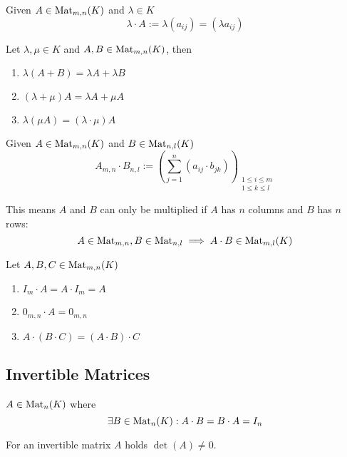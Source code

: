 \begin{definition}
   Given \(A \in \operatorname{Mat}_{m,n}(K)\) and \(\lambda \in K\)
   \[\lambda \cdot A := \lambda (a_{ij}) = (\lambda a_{ij})\]
\end{definition}

\begin{proposition}
   Let \(\lambda, \mu \in K\) and \(A, B \in \operatorname{Mat}_{m,n}(K)\), then
   \begin{enumerate}[label=\roman*, align=Center]
      \item \(\lambda (A + B) = \lambda A + \lambda B\)
      \item \((\lambda + \mu) A = \lambda A + \mu A\)
      \item \(\lambda (\mu A) = (\lambda \cdot \mu) A\)
   \end{enumerate}
\end{proposition}

\begin{definition}\label{def:matrix_mult}
   Given \(A \in \operatorname{Mat}_{m,n}(K)\) and \(B \in \operatorname{Mat}_{n,l}(K)\)
   \[A_{m,n} \cdot B_{n,l} := \left(\sum_{j=1}^n (a_{ij} \cdot b_{jk})\right)_{\substack{1 \leq i \leq m \\ 1 \leq k \leq l}}\]
\end{definition}
\begin{remark}
   This means \(A\) and \(B\) can only be multiplied if \(A\) has \(n\) columns and \(B\) has \(n\) rows:
   \[A \in \operatorname{Mat}_{m,n}, B \in \operatorname{Mat}_{n,l} \implies A \cdot B \in \operatorname{Mat}_{m,l}(K)\]
\end{remark}

\begin{proposition}
   Let \(A, B, C \in \operatorname{Mat}_{m,n}(K)\)
   \begin{enumerate}[label=\roman*, align=Center]
      \item \(I_m \cdot A = A \cdot I_m = A\)
      \item \(0_{m,n} \cdot A = 0_{m,n}\)
      \item \(A \cdot (B \cdot C) = (A \cdot B) \cdot C\)
   \end{enumerate}
\end{proposition}

\subsection{Invertible Matrices}
\begin{definition}\label{def:invertible_mat}
   \(A \in \operatorname{Mat}_n(K)\) where
   \[\exists B \in \operatorname{Mat}_n(K): A \cdot B = B \cdot A = I_n\]
\end{definition}
\begin{remark}
   For an invertible matrix \(A\) holds \(\det(A) \neq 0\).
\end{remark}

